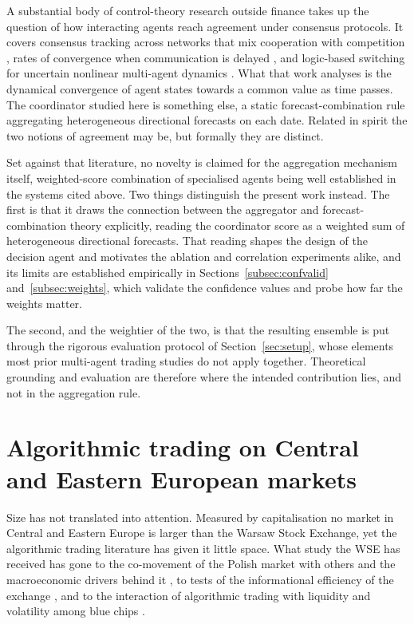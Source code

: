 A substantial body of control-theory research outside finance takes up the question of how interacting agents reach agreement under consensus protocols. It covers consensus tracking across networks that mix cooperation with competition \cite{li2025consensus}, rates of convergence when communication is delayed \cite{shi2025consensus}, and logic-based switching for uncertain nonlinear multi-agent dynamics \cite{fan2025}. What that work analyses is the dynamical convergence of agent states towards a common value as time passes. The coordinator studied here is something else, a static forecast-combination rule aggregating heterogeneous directional forecasts on each date. Related in spirit the two notions of agreement may be, but formally they are distinct.

Set against that literature, no novelty is claimed for the aggregation mechanism itself, weighted-score combination of specialised agents being well established in the systems cited above. Two things distinguish the present work instead. The first is that it draws the connection between the aggregator and forecast-combination theory \cite{batesgranger1969,clemen1989,timmermann2006} explicitly, reading the coordinator score as a weighted sum of heterogeneous directional forecasts. That reading shapes the design of the decision agent and motivates the ablation and correlation experiments alike, and its limits are established empirically in Sections~\ref{subsec:confvalid} and~\ref{subsec:weights}, which validate the confidence values and probe how far the weights matter.

The second, and the weightier of the two, is that the resulting ensemble is put through the rigorous evaluation protocol of Section~\ref{sec:setup}, whose elements most prior multi-agent trading studies do not apply together. Theoretical grounding and evaluation are therefore where the intended contribution lies, and not in the aggregation rule.

\section{Algorithmic trading on Central and Eastern European markets}\label{sec:sota_cee}

Size has not translated into attention. Measured by capitalisation no market in Central and Eastern Europe is larger than the Warsaw Stock Exchange, yet the algorithmic trading literature has given it little space. What study the WSE has received has gone to the co-movement of the Polish market with others and the macroeconomic drivers behind it \cite{czapkiewicz2018}, to tests of the informational efficiency of the exchange \cite{kompa2009}, and to the interaction of algorithmic trading with liquidity and volatility among blue chips \cite{gurgul2025}.

